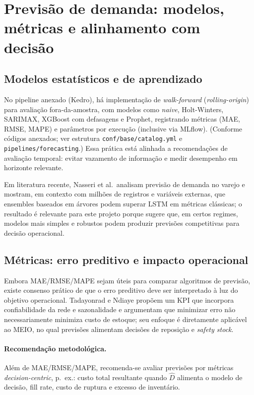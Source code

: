 \section{Previsão de demanda: modelos, métricas e alinhamento com decisão}

\subsection{Modelos estatísticos e de aprendizado}

No pipeline anexado (Kedro), há implementação de \emph{walk-forward} (\emph{rolling-origin}) para avaliação fora-da-amostra, com modelos como \emph{naive}, Holt-Winters, SARIMAX, XGBoost com defasagens e Prophet, registrando métricas (MAE, RMSE, MAPE) e parâmetros por execução (inclusive via MLflow). (Conforme códigos anexados; ver estrutura \texttt{conf/base/catalog.yml} e \texttt{pipelines/forecasting}.) Essa prática está alinhada a recomendações de avaliação temporal: evitar vazamento de informação e medir desempenho em horizonte relevante.

Em literatura recente, Nasseri et al.\ analisam previsão de demanda no varejo e mostram, em contexto com milhões de registros e variáveis externas, que ensembles baseados em árvores podem superar LSTM em métricas clássicas; o resultado é relevante para este projeto porque sugere que, em certos regimes, modelos mais simples e robustos podem produzir previsões competitivas para decisão operacional. \cite{Nasseri2023RetailDemandPrediction}

\subsection{Métricas: erro preditivo e impacto operacional}

Embora MAE/RMSE/MAPE sejam úteis para comparar algoritmos de previsão, existe consenso prático de que o erro preditivo deve ser interpretado à luz do objetivo operacional. Tadayonrad e Ndiaye propõem um KPI que incorpora confiabilidade da rede e sazonalidade e argumentam que minimizar erro não necessariamente minimiza custo de estoque; seu enfoque é diretamente aplicável ao MEIO, no qual previsões alimentam decisões de reposição e \emph{safety stock}. \cite{TadayonradNdiaye2023KPIDemandForecasting}

\paragraph{Recomendação metodológica.}
Além de MAE/RMSE/MAPE, recomenda-se avaliar previsões por métricas \emph{decision-centric}, p.\ ex.: custo total resultante quando \(\hat{D}\) alimenta o modelo de decisão, fill rate, custo de ruptura e excesso de inventário.

